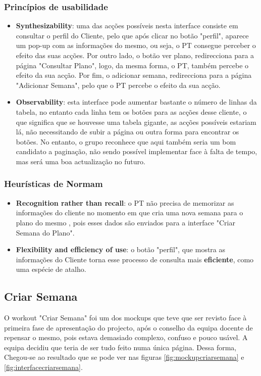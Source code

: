 \subsubsection{Princípios de usabilidade}
\begin{itemize}
    \item \textbf{Synthesizability}: uma das acções possíveis nesta interface consiste em consultar o perfil do Cliente, pelo que após clicar no botão "perfil", aparece um pop-up com as informações do mesmo, ou seja, o PT consegue perceber o efeito das suas acções. Por outro lado, o botão ver plano, redirecciona para a página "Consultar Plano", logo, da mesma forma, o PT, também percebe o efeito da sua acção. Por fim, o adicionar semana, redirecciona para a página "Adicionar Semana", pelo que o PT percebe o efeito da sua acção.
    \item \textbf{Observability}: esta interface pode aumentar bastante o número de linhas da tabela, no entanto cada linha tem os botões para as acções desse cliente, o que significa que se houvesse uma tabela gigante, as acções possíveis estariam lá, não necessitando de subir a página ou outra forma para encontrar os botões. No entanto, o grupo reconhece que aqui também seria um bom candidato a paginação, não sendo possível implementar face à falta de tempo, mas será uma boa actualização no futuro.
\end{itemize}

\subsubsection{Heurísticas de Normam}
\begin{itemize}
    \item \textbf{Recognition rather than recall}: o PT não precisa de memorizar as informações do cliente no momento em que cria uma nova semana para o plano do mesmo , pois esses dados são enviados para a interface "Criar Semana do Plano".
    \item \textbf{Flexibility and efficiency of use}: o botão "perfil", que mostra as informações do Cliente torna esse processo de consulta mais \textbf{eficiente}, como uma espécie de atalho.
    
\end{itemize}

\subsection{Criar Semana}
\label{subsec:criarsemana}
\hspace{5mm} O workout "Criar Semana" foi um dos mockups que teve que ser revisto face à primeira fase de apresentação do projecto, após o conselho da equipa docente de repensar o mesmo, pois estava demasiado complexo, confuso e pouco usável. A equipa decidiu que teria de ser tudo feito numa única página. Dessa forma, Chegou-se ao resultado que se pode ver nas figuras \ref{fig:mockupcriarsemana} e \ref{fig:interfacecriarsemana}.


